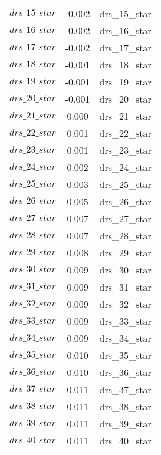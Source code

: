\begin{center}
\begin{longtable}{ccc}
$drs\_15\_star$ 	 & 	 -0.002 	 & 	 drs\_15\_star\\
$drs\_16\_star$ 	 & 	 -0.002 	 & 	 drs\_16\_star\\
$drs\_17\_star$ 	 & 	 -0.002 	 & 	 drs\_17\_star\\
$drs\_18\_star$ 	 & 	 -0.001 	 & 	 drs\_18\_star\\
$drs\_19\_star$ 	 & 	 -0.001 	 & 	 drs\_19\_star\\
$drs\_20\_star$ 	 & 	 -0.001 	 & 	 drs\_20\_star\\
$drs\_21\_star$ 	 & 	 0.000 	 & 	 drs\_21\_star\\
$drs\_22\_star$ 	 & 	 0.001 	 & 	 drs\_22\_star\\
$drs\_23\_star$ 	 & 	 0.001 	 & 	 drs\_23\_star\\
$drs\_24\_star$ 	 & 	 0.002 	 & 	 drs\_24\_star\\
$drs\_25\_star$ 	 & 	 0.003 	 & 	 drs\_25\_star\\
$drs\_26\_star$ 	 & 	 0.005 	 & 	 drs\_26\_star\\
$drs\_27\_star$ 	 & 	 0.007 	 & 	 drs\_27\_star\\
$drs\_28\_star$ 	 & 	 0.007 	 & 	 drs\_28\_star\\
$drs\_29\_star$ 	 & 	 0.008 	 & 	 drs\_29\_star\\
$drs\_30\_star$ 	 & 	 0.009 	 & 	 drs\_30\_star\\
$drs\_31\_star$ 	 & 	 0.009 	 & 	 drs\_31\_star\\
$drs\_32\_star$ 	 & 	 0.009 	 & 	 drs\_32\_star\\
$drs\_33\_star$ 	 & 	 0.009 	 & 	 drs\_33\_star\\
$drs\_34\_star$ 	 & 	 0.009 	 & 	 drs\_34\_star\\
$drs\_35\_star$ 	 & 	 0.010 	 & 	 drs\_35\_star\\
$drs\_36\_star$ 	 & 	 0.010 	 & 	 drs\_36\_star\\
$drs\_37\_star$ 	 & 	 0.011 	 & 	 drs\_37\_star\\
$drs\_38\_star$ 	 & 	 0.011 	 & 	 drs\_38\_star\\
$drs\_39\_star$ 	 & 	 0.011 	 & 	 drs\_39\_star\\
$drs\_40\_star$ 	 & 	 0.011 	 & 	 drs\_40\_star\\
\bottomrule%
\end{longtable}
\end{center}
